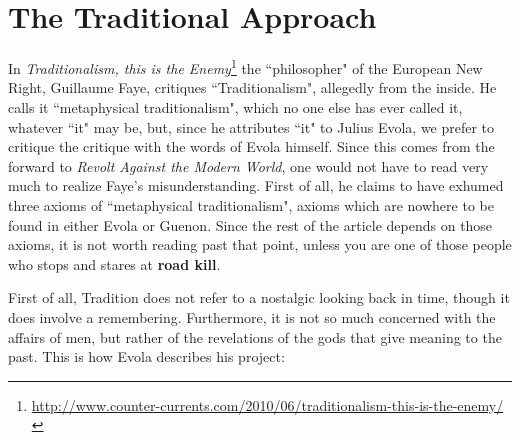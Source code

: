 \section{The Traditional Approach}

In \textit{Traditionalism, this is the Enemy}\footnote{\url{http://www.counter-currents.com/2010/06/traditionalism-this-is-the-enemy/}} the ``philosopher" of the European New Right, Guillaume Faye, critiques ``Traditionalism", allegedly from the inside. He calls it ``metaphysical traditionalism", which no one else has ever called it, whatever ``it" may be, but, since he attributes ``it" to Julius Evola, we prefer to critique the critique with the words of Evola himself. Since this comes from the forward to \emph{Revolt Against the Modern World}, one would not have to read very much to realize Faye's misunderstanding. First of all, he claims to have exhumed three axioms of ``metaphysical traditionalism", axioms which are nowhere to be found in either Evola or Guenon. Since the rest of the article depends on those axioms, it is not worth reading past that point, unless you are one of those people who stops and stares at \textbf{road kill}.

First of all, Tradition does not refer to a nostalgic looking back in time, though it does involve a remembering. Furthermore, it is not so much concerned with the affairs of men, but rather of the revelations of the gods that give meaning to the past. This is how Evola describes his project:


